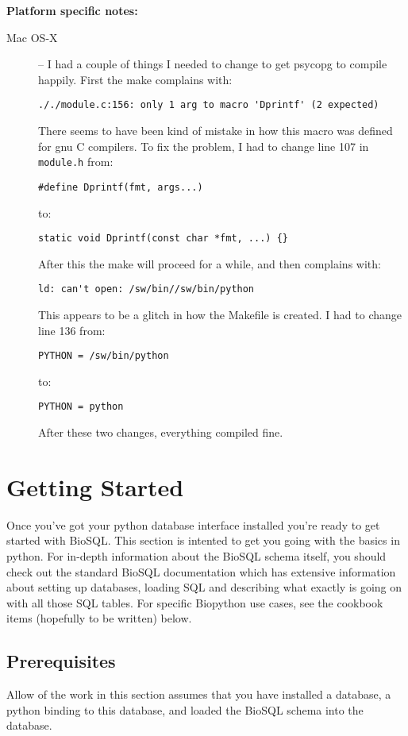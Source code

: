 \documentclass{article}
\begin{document}
\textbf{\large Platform specific notes:}
\begin{description}
  \item[Mac OS-X] -- I had a couple of things I needed to change to get
  psycopg to compile happily. First the make complains with:

  \verb|././module.c:156: only 1 arg to macro 'Dprintf' (2 expected)|

  There seems to have been kind of mistake in how this macro was defined
  for gnu C compilers. To fix the problem, I had to change line 107 in
  \verb|module.h| from:

  \verb|#define Dprintf(fmt, args...)|

  to:

  \verb|static void Dprintf(const char *fmt, ...) {}|

  After this the make will proceed for a while, and then complains with:

  \verb|ld: can't open: /sw/bin//sw/bin/python|

  This appears to be a glitch in how the Makefile is created. I had to
  change line 136 from:

  \verb|PYTHON = /sw/bin/python|

  to:

  \verb|PYTHON = python|

  After these two changes, everything compiled fine.
\end{description}

\section{Getting Started}

Once you've got your python database interface installed you're ready to
get started with BioSQL. This section is intented to get you going
with the basics in python. For in-depth information about the BioSQL
schema itself, you should check out the standard BioSQL documentation
which has extensive information about setting up databases, loading SQL
and describing what exactly is going on with all those SQL tables. For
specific Biopython use cases, see the cookbook items (hopefully to be
written) below.

\subsection{Prerequisites}

Allow of the work in this section assumes that you have installed a
database, a python binding to this database, and loaded the BioSQL
schema into the database. 
\end{document}
